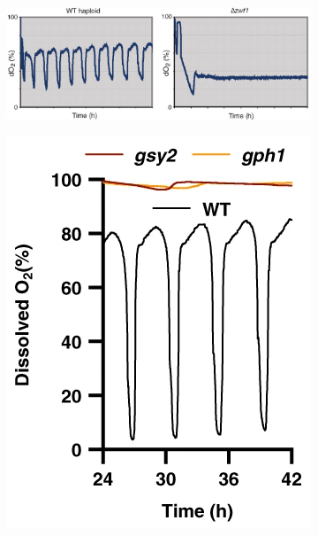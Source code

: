 \begin{figure}
  \centering
  \begin{subfigure}[htpb]{0.9\textwidth}
   \centering
   \includegraphics[width=\textwidth]{tuCyclicChangesMetabolic2007_2c_adapted}
   \caption{
   }
   \label{fig:intro-ymc-zwf1}
  \end{subfigure}
  \begin{subfigure}[htpb]{0.4\textwidth}
   \centering
   \includegraphics[width=\textwidth]{oneillEukaryoticCellBiology2020_5a_adapted}
   \caption{
   }
   \label{fig:intro-ymc-gsy2-gph1}

\end{subfigure}
\end{figure}
